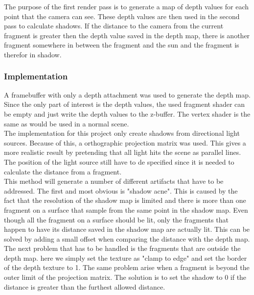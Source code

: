 \documentclass{article}
\begin{document}
  			The purpose of the first render pass is to generate a map of depth values for each point that the camera can see. These depth values are then used in the second pass to calculate shadows. If the distance to the camera from the current fragment is greater then the depth value saved in the depth map, there is another fragment somewhere in between the fragment and the sun and the fragment is therefor in shadow. \citep{ragnemalm2015so}
  			
  			\subsubsection*{Implementation}
  				
  				A framebuffer with only a depth attachment was used to generate the depth map. Since the only part of interest is the depth values, the used fragment shader can be empty and just write the depth values to the z-buffer. The vertex shader is the same as would be used in a normal scene. \\
  				
  				The implementation for this project only create shadows from directional light sources. Because of this, a orthographic projection matrix was used. This gives a more realistic result by pretending that all light hits the scene as parallel lines. The position of the light source still have to de specified since it is needed to calculate the distance from a fragment. \\
  				
  				This method will generate a number of different artifacts that have to be addressed. The first and most obvious is "shadow acne". This is caused by the fact that the resolution of the shadow map is limited and there is more than one fragment on a surface that sample from the same point in the shadow map. Even though all the fragment on a surface should be lit, only the fragments that happen to have its distance saved in the shadow map are actually lit. This can be solved by adding a small offset when comparing the distance with the depth map. \\
  				
  				The next problem that has to be handled is the fragments that are outside the depth map. here we simply set the texture as "clamp to edge" and set the border of the depth texture to 1. The same problem arise when a fragment is beyond the outer limit of the projection matrix. The solution is to set the shadow to 0 if the distance is greater than the furthest allowed distance.
  				
\end{document}
